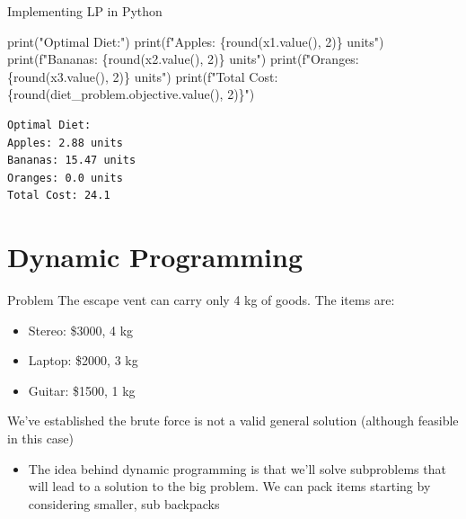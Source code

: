 \documentclass[
  ignorenonframetext,
]{beamer}
\newenvironment{Shaded}{\begin{snugshade}}{\end{snugshade}}
\newcommand{\BuiltInTok}[1]{\textcolor[rgb]{0.00,0.23,0.31}{#1}}
\newcommand{\DecValTok}[1]{\textcolor[rgb]{0.68,0.00,0.00}{#1}}
\newcommand{\NormalTok}[1]{\textcolor[rgb]{0.00,0.23,0.31}{#1}}
\newcommand{\SpecialCharTok}[1]{\textcolor[rgb]{0.37,0.37,0.37}{#1}}
\newcommand{\SpecialStringTok}[1]{\textcolor[rgb]{0.13,0.47,0.30}{#1}}
\newcommand{\StringTok}[1]{\textcolor[rgb]{0.13,0.47,0.30}{#1}}
\providecommand{\tightlist}{%
  \setlength{\itemsep}{0pt}\setlength{\parskip}{0pt}}\usepackage{longtable,booktabs,array}
\begin{document}
\begin{frame}[fragile]{Implementing LP in Python}
\protect\hypertarget{implementing-lp-in-python-2}{}
\begin{Shaded}
\begin{Highlighting}[]
\BuiltInTok{print}\NormalTok{(}\StringTok{"Optimal Diet:"}\NormalTok{)}
\BuiltInTok{print}\NormalTok{(}\SpecialStringTok{f"Apples: }\SpecialCharTok{\{}\BuiltInTok{round}\NormalTok{(x1.value(), }\DecValTok{2}\NormalTok{)}\SpecialCharTok{\}}\SpecialStringTok{ units"}\NormalTok{)}
\BuiltInTok{print}\NormalTok{(}\SpecialStringTok{f"Bananas: }\SpecialCharTok{\{}\BuiltInTok{round}\NormalTok{(x2.value(), }\DecValTok{2}\NormalTok{)}\SpecialCharTok{\}}\SpecialStringTok{ units"}\NormalTok{)}
\BuiltInTok{print}\NormalTok{(}\SpecialStringTok{f"Oranges: }\SpecialCharTok{\{}\BuiltInTok{round}\NormalTok{(x3.value(), }\DecValTok{2}\NormalTok{)}\SpecialCharTok{\}}\SpecialStringTok{ units"}\NormalTok{)}
\BuiltInTok{print}\NormalTok{(}\SpecialStringTok{f"Total Cost: }\SpecialCharTok{\{}\BuiltInTok{round}\NormalTok{(diet\_problem.objective.value(), }\DecValTok{2}\NormalTok{)}\SpecialCharTok{\}}\SpecialStringTok{"}\NormalTok{)}
\end{Highlighting}
\end{Shaded}

\begin{verbatim}
Optimal Diet:
Apples: 2.88 units
Bananas: 15.47 units
Oranges: 0.0 units
Total Cost: 24.1
\end{verbatim}
\end{frame}

\hypertarget{dynamic-programming}{%
\section{Dynamic Programming}\label{dynamic-programming}}

\begin{frame}{Problem}
\protect\hypertarget{problem}{}
The escape vent can carry only 4 kg of goods. The items are:

\begin{itemize}
\item
  Stereo: \$3000, 4 kg
\item
  Laptop: \$2000, 3 kg
\item
  Guitar: \$1500, 1 kg
\end{itemize}

We've established the brute force is not a valid general solution
(although feasible in this case)

\begin{itemize}
\tightlist
\item
  The idea behind dynamic programming is that we'll solve subproblems
  that will lead to a solution to the big problem. We can pack items
  starting by considering smaller, sub backpacks
\end{itemize}
\end{frame}
\end{document}
